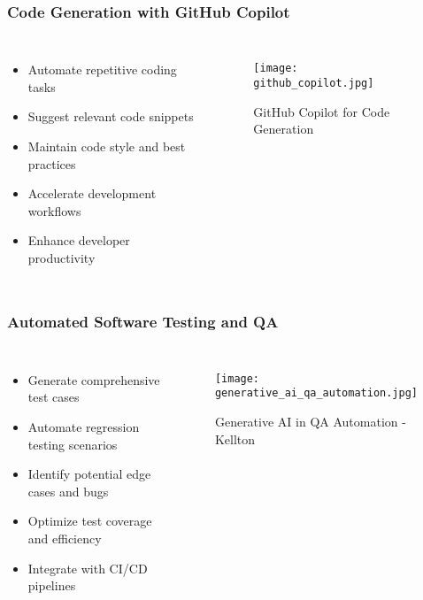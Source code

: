\begin{frame}[fragile]\frametitle{Code Generation with GitHub Copilot}
\begin{columns}
\begin{itemize}
    \item Automate repetitive coding tasks
    \item Suggest relevant code snippets
    \item Maintain code style and best practices
    \item Accelerate development workflows
    \item Enhance developer productivity
\end{itemize}
\begin{figure}
    \texttt{[image: github\_copilot.jpg]}
    \caption{GitHub Copilot for Code Generation}
\end{figure}
\end{columns}
\end{frame}

\begin{frame}[fragile]\frametitle{Automated Software Testing and QA}
\begin{columns}
\begin{itemize}
    \item Generate comprehensive test cases
    \item Automate regression testing scenarios
    \item Identify potential edge cases and bugs
    \item Optimize test coverage and efficiency
    \item Integrate with CI/CD pipelines
\end{itemize}
\begin{figure}
    \texttt{[image: generative\_ai\_qa\_automation.jpg]}
    \caption{Generative AI in QA Automation - Kellton}
\end{figure}
\end{columns}
\end{frame}

